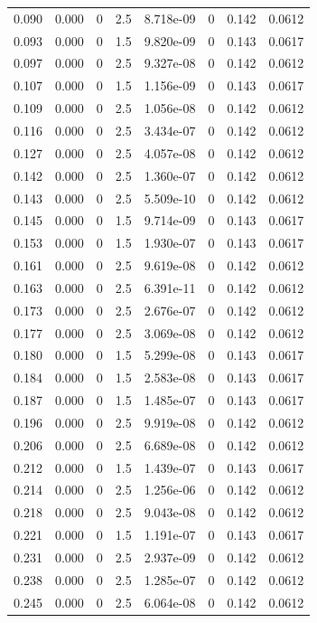 \documentclass[preview]{standalone}
\begin{document}
{{\begin{tabular}{L{1.2cm}C{1.2cm} C{0.3cm}C{0.5cm} C{1.4cm}C{1.4cm} C{1.4cm}C{1.4cm}}
  0.090  &  0.000  & 0     & 2.5 &  8.718e-09  & 0  & 0.142 &  0.0612   \\ 
  0.093  &  0.000  & 0     & 1.5 &  9.820e-09  & 0  & 0.143 &  0.0617   \\ 
  0.097  &  0.000  & 0     & 2.5 &  9.327e-08  & 0  & 0.142 &  0.0612   \\ 
  0.107  &  0.000  & 0     & 1.5 &  1.156e-09  & 0  & 0.143 &  0.0617   \\ 
  0.109  &  0.000  & 0     & 2.5 &  1.056e-08  & 0  & 0.142 &  0.0612   \\ 
  0.116  &  0.000  & 0     & 2.5 &  3.434e-07  & 0  & 0.142 &  0.0612   \\ 
  0.127  &  0.000  & 0     & 2.5 &  4.057e-08  & 0  & 0.142 &  0.0612   \\ 
  0.142  &  0.000  & 0     & 2.5 &  1.360e-07  & 0  & 0.142 &  0.0612   \\ 
  0.143  &  0.000  & 0     & 2.5 &  5.509e-10  & 0  & 0.142 &  0.0612   \\ 
  0.145  &  0.000  & 0     & 1.5 &  9.714e-09  & 0  & 0.143 &  0.0617   \\ 
  0.153  &  0.000  & 0     & 1.5 &  1.930e-07  & 0  & 0.143 &  0.0617   \\ 
  0.161  &  0.000  & 0     & 2.5 &  9.619e-08  & 0  & 0.142 &  0.0612   \\ 
  0.163  &  0.000  & 0     & 2.5 &  6.391e-11  & 0  & 0.142 &  0.0612   \\ 
  0.173  &  0.000  & 0     & 2.5 &  2.676e-07  & 0  & 0.142 &  0.0612   \\ 
  0.177  &  0.000  & 0     & 2.5 &  3.069e-08  & 0  & 0.142 &  0.0612   \\ 
  0.180  &  0.000  & 0     & 1.5 &  5.299e-08  & 0  & 0.143 &  0.0617   \\ 
  0.184  &  0.000  & 0     & 1.5 &  2.583e-08  & 0  & 0.143 &  0.0617   \\ 
  0.187  &  0.000  & 0     & 1.5 &  1.485e-07  & 0  & 0.143 &  0.0617   \\ 
  0.196  &  0.000  & 0     & 2.5 &  9.919e-08  & 0  & 0.142 &  0.0612   \\ 
  0.206  &  0.000  & 0     & 2.5 &  6.689e-08  & 0  & 0.142 &  0.0612   \\ 
  0.212  &  0.000  & 0     & 1.5 &  1.439e-07  & 0  & 0.143 &  0.0617   \\ 
  0.214  &  0.000  & 0     & 2.5 &  1.256e-06  & 0  & 0.142 &  0.0612   \\ 
  0.218  &  0.000  & 0     & 2.5 &  9.043e-08  & 0  & 0.142 &  0.0612   \\ 
  0.221  &  0.000  & 0     & 1.5 &  1.191e-07  & 0  & 0.143 &  0.0617   \\ 
  0.231  &  0.000  & 0     & 2.5 &  2.937e-09  & 0  & 0.142 &  0.0612   \\ 
  0.238  &  0.000  & 0     & 2.5 &  1.285e-07  & 0  & 0.142 &  0.0612   \\ 
  0.245  &  0.000  & 0     & 2.5 &  6.064e-08  & 0  & 0.142 &  0.0612   \\ 
\hline 
\end{tabular} 

}}
\end{document}
